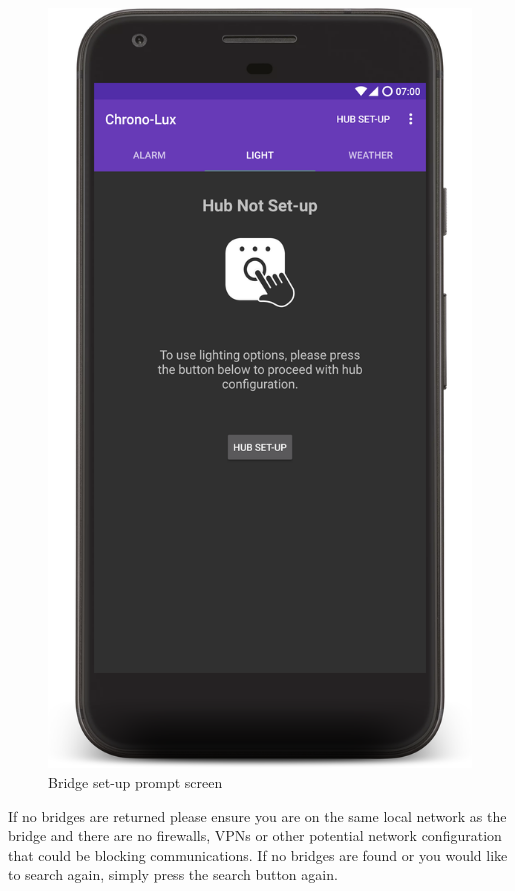 \begin{figure}[H]
  \centering
  \includegraphics[scale=0.1]{Images/setupPrompt.png}
  \caption{Bridge set-up prompt screen}
  \label{fig:setupPrompt}
\end{figure}

If no bridges are returned please ensure you are on the same local
network as the bridge and there are no firewalls, VPNs or other
potential network configuration that could be blocking communications.
If no bridges are found or you would like to search again, simply press
the search button again.

